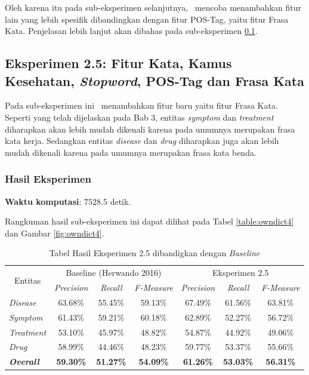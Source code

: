 	Oleh karena itu pada sub-eksperimen selanjutnya, \saya~mencoba menambahkan fitur lain yang lebih spesifik dibandingkan dengan fitur POS-Tag, yaitu fitur Frasa Kata. Penjelasan lebih lanjut akan dibahas pada sub-eksperimen \ref{eks:subeksfrasa}.
	
	\subsection{Eksperimen 2.5: Fitur Kata, Kamus Kesehatan, \textit{Stopword}, POS-Tag dan Frasa Kata}\label{eks:subeksfrasa}
	Pada sub-eksperimen ini \saya~menambahkan fitur baru yaitu fitur Frasa Kata. Seperti yang telah dijelaskan pada Bab 3, entitas \textit{symptom} dan \textit{treatment} diharapkan akan lebih mudah dikenali karena pada umumnya merupakan frasa kata kerja. Sedangkan entitas \textit{disease} dan \textit{drug} diharapkan juga akan lebih mudah dikenali karena pada umumnya merupakan frasa kata benda.
	
	\subsubsection{Hasil Eksperimen}
	\textbf{Waktu komputasi}: $ 7528.5 $ detik.
	
	Rangkuman hasil sub-eksperimen ini dapat dilihat pada Tabel \ref{table:owndict4} dan Gambar \ref{fig:owndict4}.
	
	\begin{table}
		\centering
		\caption{Tabel Hasil Eksperimen 2.5 dibandigkan dengan \textit{Baseline}}
		\begin{tabular}{|l|c|c|c|c|c|c|}
			\hline
			\multicolumn{1}{|c|}{\multirow{2}{*}{Entitas}} & \multicolumn{3}{c|}{Baseline (Herwando 2016)} & \multicolumn{3}{c|}{Eksperimen 2.5} \\ \cline{2-7} 
			\multicolumn{1}{|c|}{} & \textit{Precision} & \textit{Recall} & \textit{F-Measure} & \textit{Precision} & \textit{Recall} & \textit{F-Measure} \\ \hline
			\textit{Disease} & 63.68\% & 55.45\% & 59.13\% & 67.49\% & 61.56\% & 63.81\% \\ \hline
			\textit{Symptom} & 61.43\% & 59.21\% & 60.18\% & 62.89\% & 52.27\% & 56.72\% \\ \hline
			\textit{Treatment} & 53.10\% & 45.97\% & 48.82\% & 54.87\% & 44.92\% & 49.06\% \\ \hline
			\textit{Drug} & 58.99\% & 44.46\% & 48.23\% & 59.77\% & 53.37\% & 55.66\% \\ \hline
			\textit{\textbf{Overall}} & \textbf{59.30\%} & \textbf{51.27\%} & \textbf{54.09\%} & \textbf{61.26\%} & \textbf{53.03\%} & \textbf{56.31\%} \\ \hline
		\end{tabular}
		\label{table:owndict5}
	\end{table}

